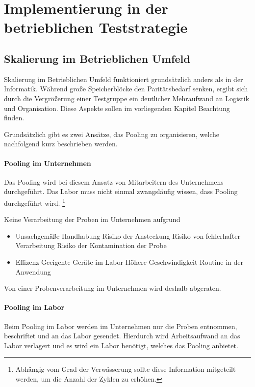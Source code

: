\chapter{Implementierung in der betrieblichen Teststrategie}

\section{Skalierung im Betrieblichen Umfeld}
Skalierung im Betrieblichen Umfeld funktioniert grundsätzlich anders als in der Informatik.
Während große Speicherblöcke den Paritätsbedarf senken, ergibt sich durch die Vergrößerung einer Testgruppe ein deutlicher Mehraufwand an Logistik und Organisation. 
Diese Aspekte sollen im vorliegenden Kapitel Beachtung finden.

Grundsätzlich gibt es zwei Ansätze, das Pooling zu organisieren, welche nachfolgend kurz beschrieben werden.

\subsubsection{Pooling im Unternehmen}
Das Pooling wird bei diesem Ansatz von Mitarbeitern des Unternehmens durchgeführt.
Das Labor muss nicht einmal zwangsläufig wissen, dass Pooling durchgeführt wird.
\footnote{Abhängig vom Grad der Verwässerung sollte diese Information mitgeteilt werden, um die Anzahl der Zyklen zu erhöhen.}

Keine Verarbeitung der Proben im Unternehmen aufgrund 
\begin{itemize}
	\item Unsachgemäße Handhabung
	\subitem Risiko der Ansteckung
	\subitem Risiko von fehlerhafter Verarbeitung
	\subitem Risiko der Kontamination der Probe
	\item Effizenz
	\subitem Geeigente Geräte im Labor
	\subitem Höhere Geschwindigkeit
	\subitem Routine in der Anwendung
\end{itemize}

Von einer Probenverarbeitung im Unternehmen wird deshalb abgeraten.

\subsubsection{Pooling im Labor}
Beim Pooling im Labor werden im Unternehmen nur die Proben entnommen, beschriftet und an das Labor gesendet.
Hierdurch wird Arbeitsaufwand an das Labor verlagert und es wird ein Labor benötigt, welches das Pooling anbietet.

